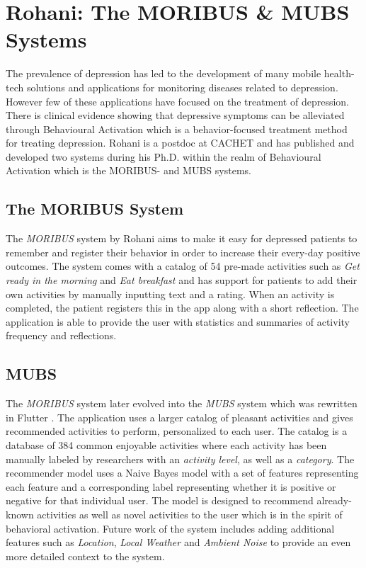\section{Rohani: The MORIBUS \& MUBS Systems}
The prevalence of depression has led to the development of many mobile health-tech solutions and applications for monitoring diseases related to depression. However few of these applications have focused on the treatment of depression. There is clinical evidence showing that depressive symptoms can be alleviated through Behavioural Activation which is a behavior-focused treatment method for treating depression. Rohani is a postdoc at CACHET and has published and developed two systems during his Ph.D. within the realm of Behavioural Activation which is the MORIBUS- and MUBS systems.

\subsection{The MORIBUS System}
The \textit{MORIBUS} system \cite{moribus} by Rohani aims to make it easy for depressed patients to remember and register their behavior in order to increase their every-day positive outcomes. The system comes with a catalog of 54 pre-made activities such as \textit{Get ready in the morning} and \textit{Eat breakfast} and has support for patients to add their own activities by manually inputting text and a rating. When an activity is completed, the patient registers this in the app along with a short reflection. The application is able to provide the user with statistics and summaries of activity frequency and reflections.

\subsection{MUBS}
The \textit{MORIBUS} system later evolved into the \textit{MUBS} system which was rewritten in Flutter \cite{mubs-rohani}. The application uses a larger catalog of pleasant activities and gives recommended activities to perform, personalized to each user. The catalog is a database of 384 common enjoyable activities where each activity has been manually labeled by researchers with an \textit{activity level}, as well as a \textit{category}. The recommender model uses a Naive Bayes model with a set of features representing each feature and a corresponding label representing whether it is positive or negative for that individual user. The model is designed to recommend already-known activities as well as novel activities to the user which is in the spirit of behavioral activation. Future work of the system includes adding additional features such as \textit{Location}, \textit{Local Weather} and \textit{Ambient Noise} to provide an even more detailed context to the system.

